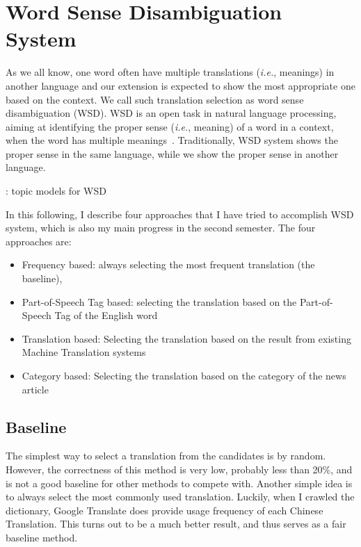 \section{Word Sense Disambiguation System}
\begin{CJK}{UTF8}{gbsn}
As we all know, one word often have multiple translations ({\it i.e.}, meanings) in another language and our extension is expected to show the most appropriate one based on the context. We call such translation selection as word sense disambiguation (WSD).
WSD is an open task in natural language processing, aiming at identifying the proper sense ({\it i.e.}, meaning) of a word  in a context, when the word has multiple meanings~\cite{Navigli2009}. Traditionally, WSD system shows the proper sense in the same language, while we show the proper sense in another language.



\cite{Boyd-Graber2007}: topic models for WSD

In this following, I describe four approaches that I have tried to accomplish WSD system, which is also my main progress in the second semester. The four approaches are: 
\begin{itemize}
\item Frequency based: always selecting the most frequent translation (the baseline),
\item Part-of-Speech Tag based: selecting the translation based on the Part-of-Speech Tag of the English word
\item Translation based: Selecting the translation based on the result from existing Machine Translation systems
\item Category based: Selecting the translation based on the category of the news article
\end{itemize}

\subsection{Baseline}
The simplest way to select a translation from the candidates is by random. However, the correctness of this method is very low, probably less than 20\%, and is not a good baseline for other methods to compete with. Another simple idea is to always select the most commonly used translation. Luckily, when I crawled the dictionary, Google Translate does provide usage frequency of each Chinese Translation.  This turns out to be a much better result, and thus serves as a fair baseline method.
\\

\end{CJK}
